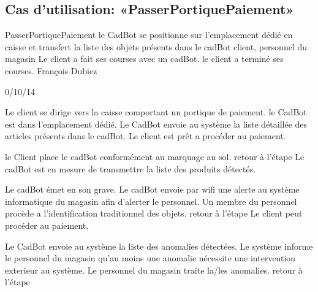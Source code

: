 ﻿%
\subsection{Cas d'utilisation: «PasserPortiquePaiement» }

\startCU
\nom PasserPortiquePaiement
\but le CadBot se positionne sur l'emplacement dédié en caisse et transfert la liste des objets présents dans le cadBot
\acteur client, personnel du magasin
\precondition Le client a fait ses courses avec un cadBot.
\declenchement le client a terminé ses courses.
\auteur François Dubiez
\date 30/10/14

\nominal %
\startnominal
\etape[SA1] Le client se dirige vers la caisse comportant un portique de paiement.
\etape[RETOUR] le CadBot est dans l'emplacement dédié.
\etape[SA2] Le CadBot envoie au système la liste détaillée des articles présents dans le cadBot.
\stopnominal
\postcondition Le client est prêt a procéder au paiement.

\alternatifs %
\startalternatif[SA1] %
\startcondition[ModeManuel] 
  \etape le Client place le cadBot conformément au marquage au sol.
  \etape retour à l'étape \in[RETOUR]
\stopcondition
\postcondition Le cadBot est en mesure de transmettre la liste des produits détectés.
\stopalternatif

\startalternatif[RETOUR] 
  \etape Le cadBot émet en son grave.
  \etape Le cadBot envoie par wifi une alerte au système informatique du magasin afin d'alerter le personnel.
 \etape Un membre du personnel procède a l'identification traditionnel des objets. 
  \etape retour à l'étape \in[RETOUR2]
\stopcondition
\postcondition Le client peut procéder au paiement.
\stopalternatif

\startalternatif[SA2]
\startcondition[Anomalies]
  \etape Le CadBot envoie au système la liste des anomalies détectées.
    \etape Le système informe le personnel du magasin qu'au moins une anomalie nécessite une intervention exterieur au système.
  \etape Le personnel du magasin traite la/les anomalies.
  \etape retour à l'étape \in[RETOUR2]
\stopcondition
\stopalternatif

\exception %

\stopCU

